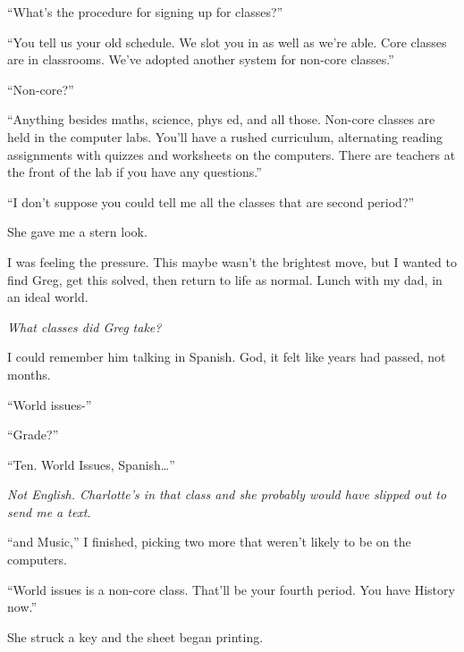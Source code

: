 ``What's the procedure for signing up for classes?''



``You tell us your old schedule.  We slot you in as well as we're able.  Core classes are in classrooms.  We've adopted another system for non-core classes.''



``Non-core?''



``Anything besides maths, science, phys ed, and all those.  Non-core classes are held in the computer labs.  You'll have a rushed curriculum, alternating reading assignments with quizzes and worksheets on the computers.  There are teachers at the front of the lab if you have any questions.''



``I don't suppose you could tell me all the classes that are second period?''



She gave me a stern look.



I was feeling the pressure.  This maybe wasn't the brightest move, but I wanted to find Greg, get this solved, then return to life as normal.  Lunch with my dad, in an ideal world.



\emph{What classes did Greg take?}



I could remember him talking in Spanish.  God, it felt like years had passed, not months.



``World issues-''



``Grade?''



``Ten.  World Issues, Spanish\ldots''



\emph{Not English.  Charlotte's in that class and she probably would have slipped out to send me a text}.



``\ldotsHistory and Music,'' I finished, picking two more that weren't likely to be on the computers.



``World issues is a non-core class.  That'll be your fourth period.  You have History now.''



She struck a key and the sheet began printing.




